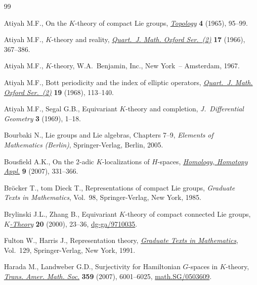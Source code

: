 \documentclass[pdftex]{sigma}
\numberwithin{equation}{section}
\begin{document}
\begin{thebibliography}{99}
\footnotesize\itemsep=0pt

Atiyah M.F., On the {$K$}-theory of compact {L}ie groups, \href{http://dx.doi.org/10.1016/0040-9383(65)90051-0}{\textit{Topology}}
  \textbf{4} (1965), 95--99.

Atiyah M.F., {$K$}-theory and reality, \href{http://dx.doi.org/10.1093/qmath/17.1.367}{\textit{Quart.~J. Math. Oxford Ser.~(2)}}
  \textbf{17} (1966), 367--386.

Atiyah M.F., {$K$}-theory, W.A.~Benjamin, Inc., New York~-- Amsterdam, 1967.

Atiyah M.F., Bott periodicity and the index of elliptic operators,
  \href{http://dx.doi.org/10.1093/qmath/19.1.113}{\textit{Quart.~J. Math. Oxford Ser.~(2)}} \textbf{19} (1968), 113--140.

Atiyah M.F., Segal G.B., Equivariant {$K$}-theory and completion,
  \textit{J.~Differential Geometry} \textbf{3} (1969), 1--18.

Bourbaki N., Lie groups and {L}ie algebras, {C}hapters 7--9, \textit{Elements of
  Mathematics (Berlin)}, Springer-Verlag, Berlin, 2005.

Bousf\/ield A.K., On the 2-adic {$K$}-localizations of {$H$}-spaces,
  \href{http://dx.doi.org/10.4310/HHA.2007.v9.n1.a14}{\textit{Homology, Homotopy Appl.}} \textbf{9} (2007), 331--366.

Br{\"o}cker T., tom Dieck T., Representations of compact {L}ie groups,
  \textit{Graduate Texts in Mathematics}, Vol.~98, Springer-Verlag, New York,
  1985.

Brylinski J.L., Zhang B., Equivariant {$K$}-theory of compact connected {L}ie
  groups, \href{http://dx.doi.org/10.1023/A:1007824116324}{\textit{$K$-Theory}} \textbf{20} (2000), 23--36,
  \href{http://arxiv.org/abs/dg-ga/9710035}{dg-ga/9710035}.

Fulton W., Harris J., Representation theory, \href{http://dx.doi.org/10.1007/978-1-4612-0979-9}{\textit{Graduate Texts in
  Mathematics}}, Vol.~129, Springer-Verlag, New York, 1991.

Harada M., Landweber G.D., Surjectivity for {H}amiltonian {$G$}-spaces in
  {$K$}-theory, \href{http://dx.doi.org/10.1090/S0002-9947-07-04164-5}{\textit{Trans. Amer. Math. Soc.}} \textbf{359} (2007),
  6001--6025, \href{http://arxiv.org/abs/math.SG/0503609}{math.SG/0503609}.


\end{thebibliography}
\end{document}
